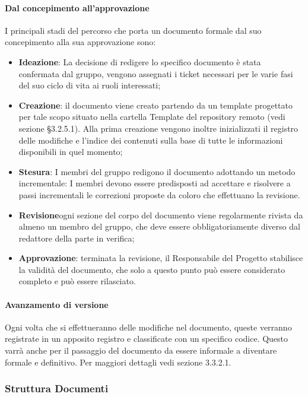 			\paragraph{Dal concepimento all’approvazione }
				I principali stadi del percorso che porta un documento formale dal suo concepimento alla sua approvazione sono:
				\begin{itemize}
					\item\textbf{Ideazione}:  La decisione di redigere lo specifico documento è stata confermata dal gruppo, vengono assegnati i ticket necessari per le varie fasi del suo ciclo di vita ai ruoli interessati;
					\item\textbf{Creazione}: il documento viene creato partendo da un template progettato per tale scopo situato nella cartella Template del repository remoto (vedi sezione §3.2.5.1). Alla prima creazione vengono inoltre inizializzati il registro delle modifiche e l’indice dei contenuti sulla base di tutte le informazioni disponibili in quel momento;
					\item\textbf{Stesura}: I membri del gruppo redigono il documento adottando un metodo incrementale: I membri devono essere predisposti ad accettare e risolvere a passi incrementali le correzioni proposte da coloro che effettuano la revisione.
					\item\textbf{Revisione}ogni sezione del corpo del documento viene regolarmente rivista da almeno un membro del gruppo, che deve essere obbligatoriamente diverso dal redattore della parte in verifica;
					\item\textbf{Approvazione}: terminata la revisione, il Responsabile del Progetto stabilisce la validità del documento, che solo a questo punto può essere considerato completo e può essere rilasciato.
				\end{itemize}
			\paragraph{Avanzamento di versione}
				Ogni volta che si effettueranno delle modifiche nel documento, queste verranno registrate in un apposito registro e classificate con un specifico codice. Questo varrà anche per il passaggio del documento da essere informale a diventare formale e definitivo.
				Per maggiori dettagli vedi sezione 3.3.2.1.


		\subsubsection{Struttura Documenti}
